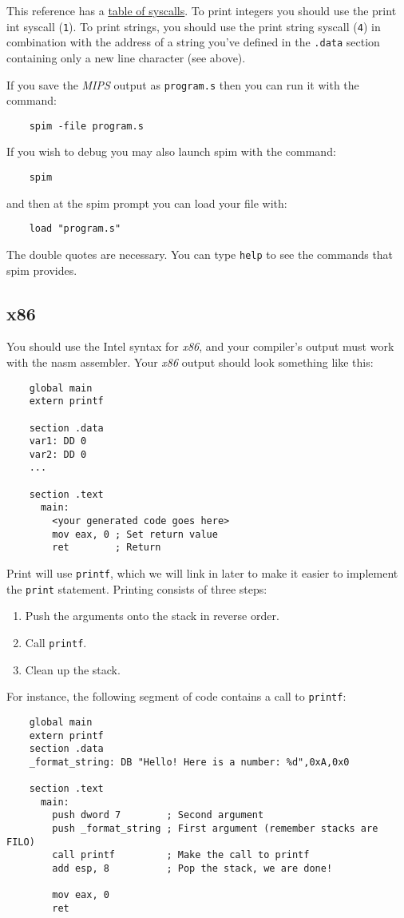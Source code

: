 \documentclass{article}
\newcommand{\code}[1]{\texttt{\textmd{#1}}}
\begin{document}
This reference has a \href{http://students.cs.tamu.edu/tanzir/csce350/reference/syscalls.html}
{table of syscalls}. To print integers you should use the print int syscall (\code{1}). To print
strings, you should use the print string syscall (\code{4}) in combination with the address of a
string you've defined in the \code{.data} section containing only a new line character (see above).

If you save the \textit{MIPS} output as \code{program.s} then you can run it with the command:
\begin{lstlisting}
	spim -file program.s
\end{lstlisting}

If you wish to debug you may also launch spim with the command:
\begin{lstlisting}
	spim
\end{lstlisting}
and then at the spim prompt you can load your file with:
\begin{lstlisting}
	load "program.s"
\end{lstlisting}
The double quotes are necessary. You can type \texttt{help} to see the commands that spim provides.

\subsection{x86}
You should use the Intel syntax for \textit{x86}, and your compiler's output must work with the
nasm assembler. Your \textit{x86} output should look something like this:

\begin{lstlisting}
	global main
	extern printf

	section .data
	var1: DD 0
	var2: DD 0
	...

	section .text
	  main:
	    <your generated code goes here>
	    mov eax, 0 ; Set return value
	    ret        ; Return
\end{lstlisting}

Print will use \code{printf}, which we will link in later to make it easier to implement the
\code{print} statement. Printing consists of three steps:
\begin{enumerate}
	\item Push the arguments onto the stack in reverse order.
	\item Call \code{printf}.
	\item Clean up the stack.
\end{enumerate}

For instance, the following segment of code contains a call to \code{printf}:
\begin{lstlisting}
	global main
	extern printf
	section .data
	_format_string: DB "Hello! Here is a number: %d",0xA,0x0

	section .text
	  main:
	    push dword 7        ; Second argument
	    push _format_string ; First argument (remember stacks are FILO)
	    call printf         ; Make the call to printf
	    add esp, 8          ; Pop the stack, we are done!

	    mov eax, 0
	    ret
\end{lstlisting}
\end{document}
